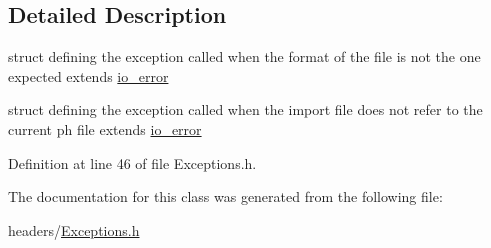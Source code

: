 \subsection{Detailed Description}
struct defining the exception called when the format of the file is not the one expected extends \hyperlink{structio__error}{io\+\_\+error} 

struct defining the exception called when the import file does not refer to the current ph file extends \hyperlink{structio__error}{io\+\_\+error} 

Definition at line 46 of file Exceptions.\+h.



The documentation for this class was generated from the following file\+:\begin{DoxyCompactItemize}
\item 
headers/\hyperlink{Exceptions_8h}{Exceptions.\+h}\end{DoxyCompactItemize}
